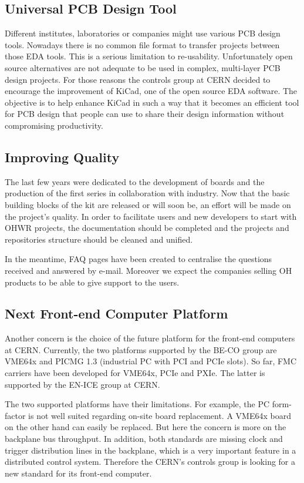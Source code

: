 \documentclass{JAC2003}
\begin{document}
\subsection{Universal PCB Design Tool}
Different institutes, laboratories or companies might use various PCB design tools.
Nowadays there is no common file format to transfer projects between those EDA tools.
This is a serious limitation to re-usability.
Unfortunately open source alternatives are not adequate to be used in complex, multi-layer PCB design projects.
For those reasons the controls group at CERN decided to encourage the improvement of KiCad, one of the open source EDA software.
The objective is to help enhance KiCad in such a way that it becomes an efficient tool for PCB design that people can use to share their design information without compromising productivity.

\subsection{Improving Quality}
The last few years were dedicated to the development of boards and the production of the first series in collaboration with industry.
Now that the basic building blocks of the kit are released or will soon be, an effort will be made on the project's quality.
In order to facilitate users and new developers to start with OHWR projects, the documentation should be completed and the projects and repositories structure should be cleaned and unified.

In the meantime, FAQ pages have been created to centralise the questions received and answered by e-mail.
Moreover we expect the companies selling OH products to be able to give support to the users.

\subsection{Next Front-end Computer Platform}
Another concern is the choice of the future platform for the front-end computers at CERN.
Currently, the two platforms supported by the BE-CO group are VME64x and PICMG 1.3 (industrial PC with PCI and PCIe slots).
So far, FMC carriers have been developed for VME64x, PCIe and PXIe.
The latter is supported by the EN-ICE group at CERN.

The two supported platforms have their limitations.
For example, the PC form-factor is not well suited regarding on-site board replacement.
A VME64x board on the other hand can easily be replaced.
But here the concern is more on the backplane bus throughput.
In addition, both standards are missing clock and trigger distribution lines in the backplane, which is a very important feature in a distributed control system.
Therefore the CERN's controls group is looking for a new standard for its front-end computer.
\end{document}

